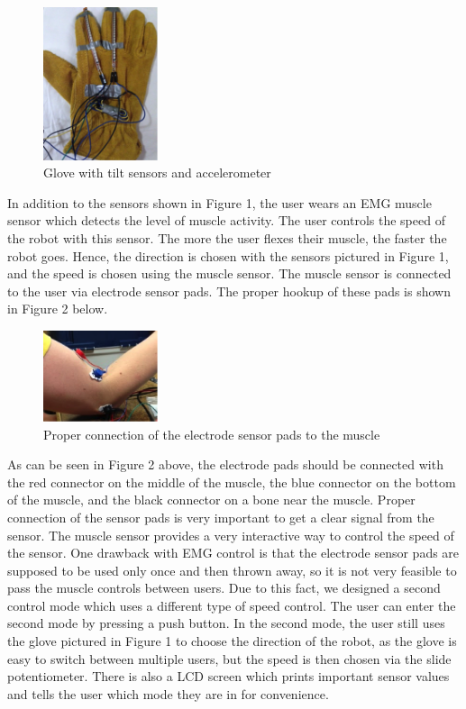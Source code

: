 \documentclass[12pt,scrartcl,titlepage]{article}
\begin{document}
  \begin{figure}[h!]
    \centering
    \includegraphics[width=0.3\textwidth]{glove.png}
    \caption{Glove with tilt sensors and accelerometer}
  \end{figure}

  In addition to the sensors shown in Figure 1, the user wears an EMG muscle sensor which detects the level of muscle activity. The user controls the speed of the robot with this sensor. The more the user flexes their muscle, the faster the robot goes. Hence, the direction is chosen with the sensors pictured in Figure 1, and the speed is chosen using the muscle sensor. The muscle sensor is connected to the user via electrode sensor pads. The proper hookup of these pads is shown in Figure 2 below.

  \begin{figure}[h!]
    \centering
    \includegraphics[width=0.3\textwidth]{arm.png}
    \caption{Proper connection of the electrode sensor pads to the muscle}
  \end{figure}

  As can be seen in Figure 2 above, the electrode pads should be connected with the red connector on the middle of the muscle, the blue connector on the bottom of the muscle, and the black connector on a bone near the muscle. Proper connection of the sensor pads is very important to get a clear signal from the sensor. The muscle sensor provides a very interactive way to control the speed of the sensor. One drawback with EMG control is that the electrode sensor pads are supposed to be used only once and then thrown away, so it is not very feasible to pass the muscle controls between users. Due to this fact, we designed a second control mode which uses a different type of speed control. The user can enter the second mode by pressing a push button. In the second mode, the user still uses the glove pictured in Figure 1 to choose the direction of the robot, as the glove is easy to switch between multiple users, but the speed is then chosen via the slide potentiometer. There is also a LCD screen which prints important sensor values and tells the user which mode they are in for convenience.
  
\end{document}

